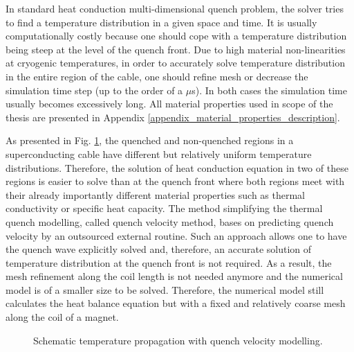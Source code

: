 \documentclass{article}
\begin{document}
In standard heat conduction multi-dimensional quench problem, the solver tries to find a temperature distribution in a given space and time. It is usually computationally costly because one should cope with a temperature distribution being steep at the level of the quench front. Due to high material non-linearities at cryogenic temperatures, in order to accurately solve temperature distribution in the entire region of the cable, one should refine mesh or decrease the simulation time step (up to the order of a $\mu$s). In both cases the simulation time usually becomes excessively long. All material properties used in scope of the thesis are presented in Appendix \ref{appendix_material_properties_description}.

As presented in Fig. \ref{fig:modelling_approach}, the quenched and non-quenched regions in a superconducting cable have different but relatively uniform temperature distributions. Therefore, the solution of heat conduction equation in two of these regions is easier to solve than at the quench front where both regions meet with their already importantly different material properties such as thermal conductivity or specific heat capacity. The method simplifying the thermal quench modelling, called quench velocity method, bases on predicting quench velocity by an outsourced external routine. Such an approach allows one to have the quench wave explicitly solved and, therefore, an accurate solution of temperature distribution at the quench front is not required. As a result, the mesh refinement along the coil length is not needed anymore and the numerical model is of a smaller size to be solved. Therefore, the numerical model still calculates the heat balance equation but with a fixed and relatively coarse mesh along the coil of a magnet. 
 
\begin{figure}[H]
\centering
{}
\caption{Schematic temperature propagation with quench velocity modelling.}
\label{fig:modelling_approach}
\end{figure}
\end{document}
